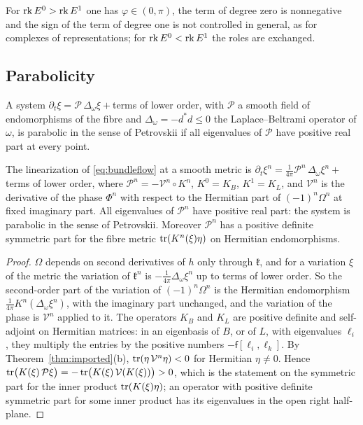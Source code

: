 For $\operatorname{rk} E^0>\operatorname{rk} E^1$ one has $\varphi\in(0,\pi)$, the term of degree zero is
nonnegative and the sign of the term of degree one is not controlled in
general, as for complexes of representations; for $\operatorname{rk} E^0<\operatorname{rk} E^1$ the roles
are exchanged.

\subsection{Parabolicity}
A system $\partial_t\xi=\mathcal P\,\Delta_\omega\xi+{}$terms of lower order,
with $\mathcal P$ a smooth field of endomorphisms of the fibre and
$\Delta_\omega=-d^*d\leq0$ the Laplace--Beltrami operator of $\omega$, is
parabolic in the sense of Petrovskii if all eigenvalues of $\mathcal P$ have
positive real part at every point.

\begin{proposition}\label{prop:parabolic}
The linearization of \eqref{eq:bundleflow} at a smooth metric is
$\partial_t\xi^n=\frac1{4\pi}\mathcal P^n\,\Delta_\omega\xi^n+{}$terms of lower
order, where $\mathcal P^n=-\mathcal V^n\circ K^n$, $K^0=K_B$, $K^1=K_L$,
and $\mathcal V^n$ is the derivative of the phase $\Phi^n$ with respect to
the Hermitian part of $(-1)^n\Omega^n$ at fixed imaginary part.
All eigenvalues of $\mathcal P^n$ have positive real part: the system is
parabolic in the sense of Petrovskii. Moreover $\mathcal P^n$ has a positive definite
symmetric part for the fibre metric $\operatorname{tr}(K^n(\xi)\eta)$ on Hermitian
endomorphisms.
\end{proposition}

\begin{proof}
$\Omega$ depends on second derivatives of $h$ only through $\mathfrak k$, and
for a variation $\xi$ of the metric the variation of $\mathfrak k^n$ is
$-\frac1{4\pi}\Delta_\omega\xi^n$ up to terms of lower order. So the
second-order part of the variation of $(-1)^n\Omega^n$ is the Hermitian
endomorphism $\frac1{4\pi}K^n(\Delta_\omega\xi^n)$, with the imaginary part
unchanged, and the variation of the phase is $\mathcal V^n$ applied to it.
The operators $K_B$ and $K_L$ are positive definite and self-adjoint on
Hermitian matrices: in an eigenbasis of $B$, or of $L$, with eigenvalues
$\ell_i$, they multiply the entries by the positive numbers
$-\mathsf f[\ell_i,\ell_k]$. By
Theorem~\ref{thm:imported}(b), $\operatorname{tr}(\eta\,\mathcal V^n\eta)<0$ for Hermitian
$\eta\neq0$. Hence
$\operatorname{tr}\bigl(K(\xi)\,\mathcal P\xi\bigr)=-\operatorname{tr}\bigl(K(\xi)\,\mathcal V(K(\xi))\bigr)>0$,
which is the statement on the symmetric part for the inner product
$\operatorname{tr}(K(\xi)\eta)$; an operator with positive definite symmetric part for
some inner product has its eigenvalues in the open right half-plane.
\end{proof}

